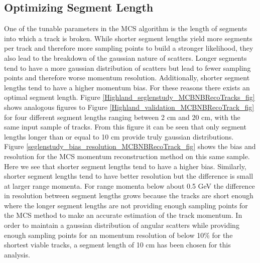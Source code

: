 \subsection{Optimizing Segment Length}\label{SegmentLength_MCBNBRecoTrack_section}
One of the tunable parameters in the MCS algorithm is the length of segments into which a track is broken. While shorter segment lengths yield more segments per track and therefore more sampling points to build a stronger likelihood, they also lead to the breakdown of the gaussian nature of scatters. Longer segments tend to have a more gaussian distribution of scatters but lead to fewer sampling points and therefore worse momentum resolution. Additionally, shorter segment lengths tend to have a higher momentum bias. For these reasons there exists an optimal segment length. Figure \ref{Highland_seglenstudy_MCBNBRecoTracks_fig} shows analogous figures to Figure \ref{Highland_validation_MCBNBRecoTrack_fig} for four different segment lengths ranging between 2 cm and 20 cm, with the same input sample of tracks. From this figure it can be seen that only segment lengths longer than or equal to 10 cm provide truly gaussian distributions.\\
Figure \ref{seglenstudy_bias_resolution_MCBNBRecoTrack_fig} shows the bias and resolution for the MCS momentum reconstruction method on this same sample. Here we see that shorter segment lengths tend to have a higher bias. Similarly, shorter segment lengths tend to have better resolution but the difference is small at larger range momenta. For range momenta below about 0.5 GeV the difference in resolution between segment lengths grows because the tracks are short enough where the longer segment lengths are not providing enough sampling points for the MCS method to make an accurate estimation of the track momentum. In order to maintain a gaussian distribution of angular scatters while providing enough sampling points for an momentum resolution of below 10\% for the shortest viable tracks, a segment length of 10 cm has been chosen for this analysis.

